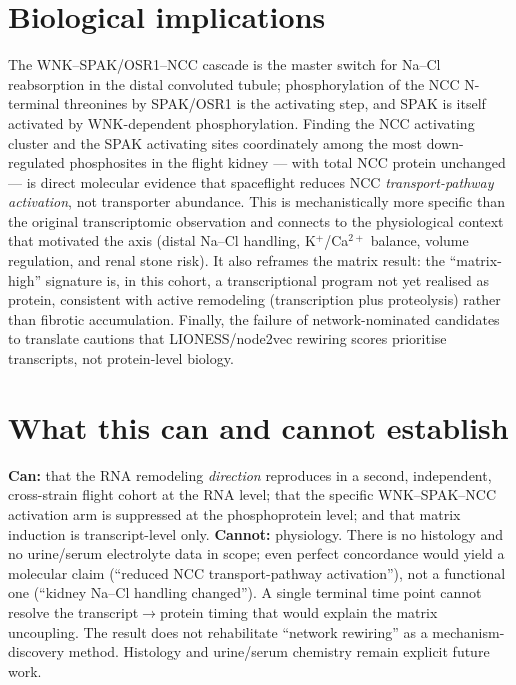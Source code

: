 \documentclass[11pt]{article}
\begin{document}
\section{Biological implications}
The WNK--SPAK/OSR1--NCC cascade is the master switch for Na--Cl reabsorption in the distal
convoluted tubule; phosphorylation of the NCC N-terminal threonines by SPAK/OSR1 is the
activating step, and SPAK is itself activated by WNK-dependent phosphorylation. Finding the
NCC activating cluster and the SPAK activating sites coordinately among the most
down-regulated phosphosites in the flight kidney --- with total NCC protein unchanged ---
is direct molecular evidence that spaceflight reduces NCC \emph{transport-pathway activation},
not transporter abundance. This is mechanistically more specific than the original
transcriptomic observation and connects to the physiological context that motivated the axis
(distal Na--Cl handling, K$^+$/Ca$^{2+}$ balance, volume regulation, and renal stone risk).
It also reframes the matrix result: the ``matrix-high'' signature is, in this cohort, a
transcriptional program not yet realised as protein, consistent with active remodeling
(transcription plus proteolysis) rather than fibrotic accumulation. Finally, the failure of
network-nominated candidates to translate cautions that LIONESS/node2vec rewiring scores
prioritise transcripts, not protein-level biology.

\section{What this can and cannot establish}
\textbf{Can:} that the RNA remodeling \emph{direction} reproduces in a second, independent,
cross-strain flight cohort at the RNA level; that the specific WNK--SPAK--NCC activation arm
is suppressed at the phosphoprotein level; and that matrix induction is transcript-level only.
\textbf{Cannot:} physiology. There is no histology and no urine/serum electrolyte data in
scope; even perfect concordance would yield a molecular claim (``reduced NCC
transport-pathway activation''), not a functional one (``kidney Na--Cl handling changed'').
A single terminal time point cannot resolve the transcript$\to$protein timing that would
explain the matrix uncoupling. The result does not rehabilitate ``network rewiring'' as a
mechanism-discovery method. Histology and urine/serum chemistry remain explicit future work.
\end{document}
